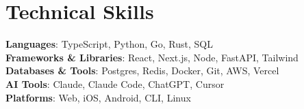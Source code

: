 \documentclass[letterpaper,11pt]{article}
\begin{document}
\section{Technical Skills}
 \begin{itemize}[leftmargin=0.15in, label={}]
    \small{\item{
     \textbf{Languages}{: TypeScript, Python, Go, Rust, SQL} \\
     \textbf{Frameworks \& Libraries}{: React, Next.js, Node, FastAPI, Tailwind} \\
     \textbf{Databases \& Tools}{: Postgres, Redis, Docker, Git, AWS, Vercel} \\
     \textbf{AI Tools}{: Claude, Claude Code, ChatGPT, Cursor} \\
     \textbf{Platforms}{: Web, iOS, Android, CLI, Linux}
    }}
 \end{itemize}

\end{document}
